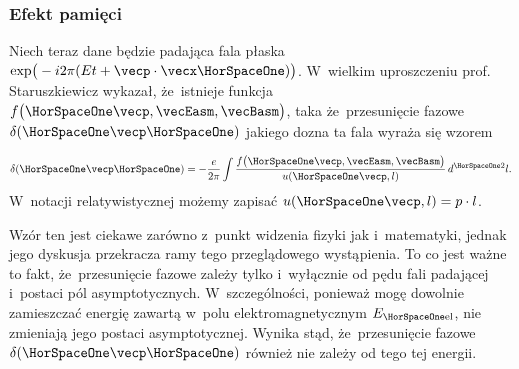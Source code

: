 \documentclass[10pt,t]{beamer}
\begin{document}
\begin{frame}
  \frametitle{Efekt pamięci}


  Niech teraz dane będzie padająca fala płaska
  $\exp\!\big( -i 2\pi ( E t + \vecp \cdot \vecx \HorSpaceOne ) \big)$. W~wielkim
  uproszczeniu prof. Staruszkiewicz wykazał, że~istnieje funkcja
  $f\big( \HorSpaceOne \vecp, \vecEasm, \vecBasm \big)$, taka
  że~przesunięcie fazowe $\delta( \HorSpaceOne \vecp \HorSpaceOne )$ jakiego
  dozna ta fala wyraża się wzorem

  \vspace{-1em}


  \begin{equation}
    \label{eq:Czym-sa-problemy-ETC-01}
    \delta( \HorSpaceOne \vecp \HorSpaceOne ) =
    -\frac{ e }{ 2\pi }
    \int \frac{ f\big( \HorSpaceOne \vecp, \vecEasm,
      \vecBasm \big) }{ u( \HorSpaceOne \vecp, l ) } \,
    d^{ \HorSpaceOne 2 } l.
  \end{equation}
  W~notacji relatywistycznej możemy zapisać
  $u( \HorSpaceOne \vecp, l ) = p \cdot l$.

  Wzór ten jest ciekawe zarówno z~punkt widzenia fizyki jak i~matematyki,
  jednak jego dyskusja przekracza ramy tego przeglądowego wystąpienia. To co
  jest ważne to fakt, że~przesunięcie fazowe zależy \alert{tylko
    i~wyłącznie} od pędu fali padającej i~postaci pól asymptotycznych.
  W~szczególności, ponieważ mogę dowolnie zamieszczać energię zawartą
  w~polu elektromagnetycznym $E_{ \HorSpaceOne \text{el} }$, nie zmieniają jego
  postaci asymptotycznej. Wynika stąd, że~przesunięcie fazowe
  $\delta( \HorSpaceOne \vecp \HorSpaceOne )$ również nie zależy od tego tej
  energii.

\end{frame}
\end{document}
